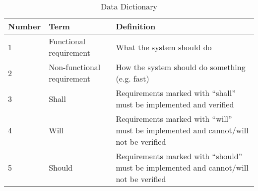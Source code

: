 \begin{table}[!h]
    \caption{Data Dictionary}
        \label{tab:Table1}
        \begin{tabular}{l|p{2cm}|p{10cm}}
            \textbf{Number} & \textbf{Term} & \textbf{Definition}\\
            \hline 1 & Functional requirement & What the system should do \\
            \hline 2 & Non-functional requirement & How the system should do something (e.g. fast) \\
            \hline 3 & Shall & Requirements marked with “shall” must be implemented and verified \\
            \hline 4 & Will & Requirements marked with “will” must be implemented and cannot/will not be verified \\
            \hline 5 & Should & Requirements marked with “should” must be implemented and cannot/will not be verified \\
        \end{tabular}
\end{table}